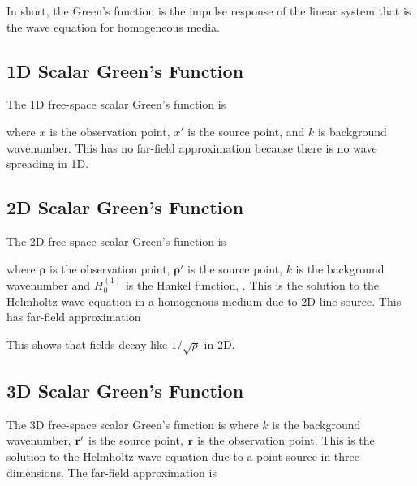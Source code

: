 In short, the Green's function is the impulse response of the linear system that is the wave equation for homogeneous media. 

\subsection{1D Scalar Green's Function}

The 1D free-space scalar Green's function is 

\noindent where $x$ is the observation point, $x'$ is the source point, and $k$ is background wavenumber. This has no far-field approximation because there is no wave spreading in 1D.   

\subsection{2D Scalar Green's Function}

The 2D free-space scalar Green's function is 

\noindent where $\boldsymbol{\rho}$ is the observation point, $\boldsymbol{\rho}'$ is the source point, $k$ is the background wavenumber and $H_0^{(1)}$ is the Hankel function, \cite{chew1995waves}. This is the solution to the Helmholtz wave equation in a homogenous medium due to 2D line source. This has far-field approximation 

This shows that fields decay like $1/\sqrt{\rho}$ in 2D. 

\subsection{3D Scalar Green's Function}

The 3D free-space scalar Green's function is 
\noindent where $k$ is the background wavenumber, $\mathbf{r}'$ is the source point, $\mathbf{r}$ is the observation point.  This is the solution to the Helmholtz wave equation due to a point source in three dimensions.  The far-field approximation is 

